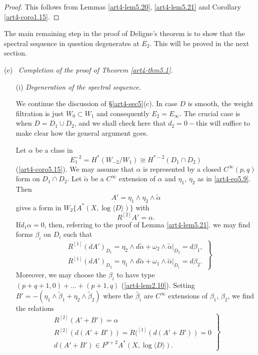 \begin{proof}
This follows from Lemmas \ref{art4-lem5.20}, \ref{art4-lem5.21} and Corollary \ref{art4-coro1.15}.
\end{proof}

The main remaining step in the proof of Deligne's theorem is to show that the spectral sequence in question degenerates at $E_2$. This will be proved in the next section.

\medskip
\noindent
(e)~ \textit{Completion of the proof of Theorem \ref{art4-thm5.1}.}     

\begin{enumerate}
\item[(i)] \textit{Degeneration of the spectral sequence.}

We continue the discussion of \S \ref{art4-sec5}(c). In case $D$ is smooth, the weight filtration is just $W_0 \subset W_1$ and consequently $E_2 = E_\infty$. The crucial case is when $D= D_1 \cup D_2$, and we shall check here that $d_2 = 0 -$this will suffice to make clear how the general argument goes.

Let $\alpha$ be a class in 
$$
E^{-2}_1 = H^\ast (W_{-2}/ W_1) \cong H^{\ast-2} (D_1 \cap D_2)
$$ 
(\cf \ref{art4-coro5.15}). We may assume that $\alpha$ is represented by a closed $C^\infty(p,q)$ form on $D_1 \cap D_2$. Let $\tilde{\alpha}$ be a $C^\infty$ extension of $\alpha$ and $\eta_1$, $\eta_2$ as in \eqref{art4-eq5.9}. Then
$$
A' = \eta_1 \wedge \eta_2 \wedge \tilde{\alpha}
$$
gives a form in $W_2 \{A^\ast (X, \log \langle D \rangle ) \}$ with 
$$
R^{[2]} A' = \alpha.
$$
If\pageoriginale  $d_1 \alpha = 0$, then, referring to the proof of Lemma \eqref{art4-lem5.21}. we may find forms $\beta_i$ on $D_i$ such that
\setcounter{equation}{22}
\begin{equation}
\left.
\begin{aligned}
& R^{[1]} (dA')_{D_1} = \eta_2 \wedge d \tilde{\alpha} + \omega_2 \wedge \tilde{\alpha}|_{D_2} = d \beta_1,\\
& R^{[1]} (dA')_{D_2}  =\eta_1 \wedge d\tilde{\alpha} + \omega_1 \wedge \tilde{\alpha}|_{D_1} = d \beta_2.
\end{aligned}
 \right\}
\label{art4-eq5.23}
\end{equation}
Moreover, we may choose the $\beta_i$ to have type $(p+q+1,0) + \ldots + (p +1,q)$  (\cf \eqref{art4-lem2.10}). Setting $B' = - (\eta_1 \wedge \tilde{\beta}_1 + \eta_2 \wedge \tilde{\beta}_2)$  where the $\tilde{\beta_i}$ are $C^{\infty}$ extensions of $\beta_1$, $\beta_2$, we find the relations
\begin{equation}
\left.
\begin{array}{c}
R^{[2]} (A' + B') =\alpha\\
R^{[2]} (d (A'+B')) = R(^{[1]} (d (A'+B')) =0\\
d(A'+B') \in F^{p+2} A^\ast (X, \log \langle D \rangle).
\end{array}
\right\} \label{art4-eq5.24}
\end{equation}


\end{enumerate}
